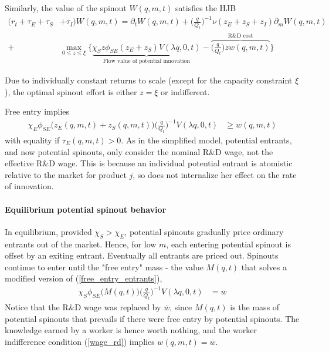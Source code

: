 \documentclass[11pt,english]{article}
\theoremstyle{remark}
\begin{document}
Similarly, the value of the spinout $W(q,m,t)$ satisfies the HJB
\begin{align}
	(r_t + \tau_E + \tau_S& + \tau_I)W(q,m,t) = \partial_t W(q,m,t) +  \Big(\frac{q}{Q_t}\Big)^{-1} \nu (z_E + z_S + z_I) \partial_m W(q,m,t) \nonumber \\
	+& \max_{0 \le z \le \xi} \Big\{ \underbrace{\chi_S z\phi_{SE}(z_E + z_S) V(\lambda q,0,t)}_{\textrm{Flow value of potential innovation}} - \overbrace{\Big(\frac{q}{Q_t}\Big) z w(q,m,t)}^{\textrm{R\&D cost}} \Big\} \label{HJB_S}
\end{align}

Due to individually constant returns to scale (except for the capacity constraint $\xi$), the optimal spinout effort is either $z = \xi$ or indifferent. 

Free entry implies
\begin{align}
\chi_E \phi_{SE}\big( z_E(q,m,t) + z_S(q,m,t) \big) \Big(\frac{q}{Q_t}\Big)^{-1}  V(\lambda q,0,t)  &\ge w(q,m,t)  \label{free_entry_entrants}
\end{align}
with equality if $\tau_E(q,m,t) > 0$. As in the simplified model, potential entrants, and now potential spinouts, only consider the nominal R\&D wage, not the effective R\&D wage. This is because an individual potential entrant is atomistic relative to the market for product $j$, so does not internalize her effect on the rate of innovation.

\paragraph{Equilibrium potential spinout behavior}

In equilibrium, provided $\chi_S > \chi_E$, potential spinouts gradually price ordinary entrants out of the market. Hence, for low $m$, each entering potential spinout is offset by an exiting entrant. Eventually all entrants are priced out. Spinouts continue to enter until the "free entry" mass - the value $M(q,t)$ that solves a modified version of (\ref{free_entry_entrants}),
\begin{align}
	\chi_S \phi_{SE}\big( M(q,t) \big) \Big(\frac{q}{Q_t}\Big)^{-1}  V(\lambda q,0,t)  &= \overline{w}  \label{free_entry_spinouts}
\end{align}
Notice that the R\&D wage was replaced by $\overline{w}$, since $M(q,t)$ is the mass of potential spinouts that prevails if there were free entry by potential spinouts. The knowledge earned by a worker is hence worth nothing, and the worker indifference condition (\ref{wage_rd}) implies $w(q,m,t) = \overline{w}$. 
\end{document}

